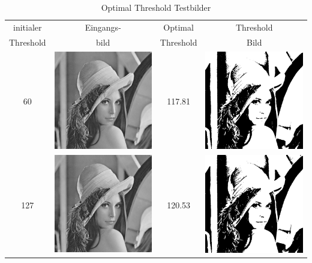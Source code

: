\documentclass[12pt,german]{article}
\begin{document}
\begin{table}[H]
  \centering
  \begin{tabular}{| c | c | c | c | }
    \hline
   initialer & Eingangs- & Optimal & Threshold \\
Threshold  & bild & Threshold & Bild \\

    \hline
     60 & \includegraphics[width=5cm]{../Bilddaten/3_lena.png} &  117.81 & \includegraphics[width=5cm]{../Bilddaten/threshold_image-01.png}\\
\hline
 127 & \includegraphics[width=5cm]{../Bilddaten/3_lena.png} &    120.53  & \includegraphics[width=5cm]{../Bilddaten/threshold_image-02.png} \\
\hline
     
  \end{tabular}
  \caption{Optimal Threshold Testbilder}
\end{table}
\end{document}

